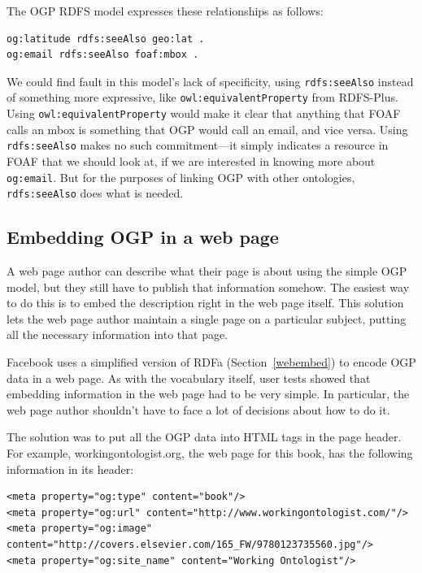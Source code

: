 The OGP RDFS model expresses these relationships as follows:

\begin{lstlisting}
og:latitude rdfs:seeAlso geo:lat . 
og:email rdfs:seeAlso foaf:mbox .
\end{lstlisting}

We could find fault in this model's lack of specificity, using
\texttt{rdfs:seeAlso} instead of something more expressive, like
\texttt{owl:equivalentProperty} from RDFS-Plus. Using \texttt{owl:equivalentProperty}
would make it clear that anything that FOAF calls an mbox is
something that OGP would call an email, and vice versa. Using
\texttt{rdfs:seeAlso} makes no such commitment---it simply indicates a resource
in FOAF that we should look at, if we are interested in knowing more
about \texttt{og:email}. But for the purposes of linking OGP with other
ontologies, \texttt{rdfs:seeAlso} does what is needed.

\subsection{Embedding OGP in a web page}

A web page author can describe what their page is about using the simple
OGP model, but they still have to publish that information somehow. The
easiest way to do this is to embed the description right in the web page
itself. This solution lets the web page author maintain a single page on
a particular subject, putting all the necessary information into that
page.

Facebook uses a simplified version of RDFa (Section~\ref{webembed}) to 
encode OGP data in a web
page. As with the vocabulary itself, user tests showed that embedding
information in the web page had to be very simple. In particular, the
web page author shouldn't have to face a lot of decisions about how to
do it.

The solution was to put all the OGP data into HTML tags in the page
header. For example, workingontologist.org, the web page for this book,
has the following information in its header:

\begin{lstlisting}
<meta property="og:type" content="book"/>
<meta property="og:url" content="http://www.workingontologist.com/"/>
<meta property="og:image" content="http://covers.elsevier.com/165_FW/9780123735560.jpg"/>
<meta property="og:site_name" content="Working Ontologist"/>
\end{lstlisting}


